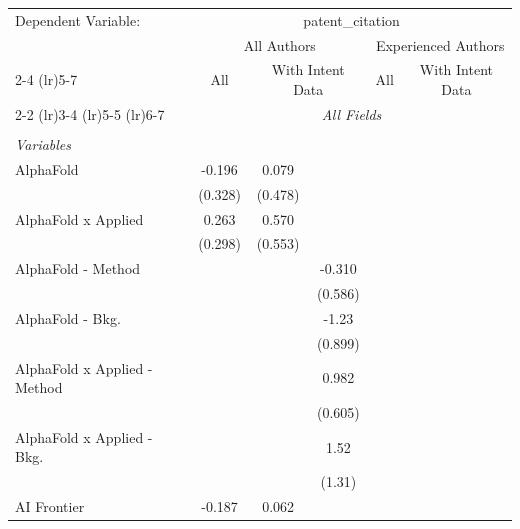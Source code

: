 \begingroup
\centering
\begin{tabular}{lcccccc}
   \tabularnewline \midrule \midrule
   Dependent Variable: & \multicolumn{6}{c}{patent\_citation}\\
 & \multicolumn{3}{c}{All Authors} & \multicolumn{3}{c}{Experienced Authors} \\
\cmidrule(lr){2-4} \cmidrule(lr){5-7}
 & \multicolumn{1}{c}{All} & \multicolumn{2}{c}{With Intent Data} & \multicolumn{1}{c}{All} & \multicolumn{2}{c}{With Intent Data} \\
\cmidrule(lr){2-2} \cmidrule(lr){3-4} \cmidrule(lr){5-5} \cmidrule(lr){6-7}
 & \multicolumn{6}{c}{\textit{All Fields}} \\ \\
   \emph{Variables}\\
   AlphaFold                      & -0.196        & 0.079   &              &       &       &   \\   
                                  & (0.328)       & (0.478) &              &       &       &   \\   
   AlphaFold x Applied            & 0.263         & 0.570   &              &       &       &   \\   
                                  & (0.298)       & (0.553) &              &       &       &   \\   
   AlphaFold - Method             &               &         & -0.310       &       &       &   \\   
                                  &               &         & (0.586)      &       &       &   \\   
   AlphaFold - Bkg.               &               &         & -1.23        &       &       &   \\   
                                  &               &         & (0.899)      &       &       &   \\   
   AlphaFold x Applied - Method   &               &         & 0.982        &       &       &   \\   
                                  &               &         & (0.605)      &       &       &   \\   
   AlphaFold x Applied - Bkg.     &               &         & 1.52         &       &       &   \\   
                                  &               &         & (1.31)       &       &       &   \\   
   AI Frontier                    & -0.187        & 0.062   &              &       &       &   \\   

\end{tabular}
